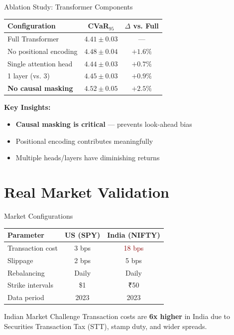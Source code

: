 \documentclass[aspectratio=169,11pt]{beamer}
\begin{document}
\begin{frame}{Ablation Study: Transformer Components}
\begin{table}
\centering
\begin{tabular}{lcc}
\toprule
\textbf{Configuration} & \textbf{CVaR$_{95}$} & \textbf{$\Delta$ vs. Full} \\
\midrule
Full Transformer & $4.41 \pm 0.03$ & --- \\
No positional encoding & $4.48 \pm 0.04$ & $+1.6\%$ \\
Single attention head & $4.44 \pm 0.03$ & $+0.7\%$ \\
1 layer (vs. 3) & $4.45 \pm 0.03$ & $+0.9\%$ \\
\textbf{No causal masking} & $4.52 \pm 0.05$ & $+2.5\%$ \\
\bottomrule
\end{tabular}
\end{table}

\vspace{0.3cm}
\textbf{Key Insights:}
\begin{itemize}
    \item \textbf{Causal masking is critical} — prevents look-ahead bias
    \item Positional encoding contributes meaningfully
    \item Multiple heads/layers have diminishing returns
\end{itemize}
\end{frame}

\section{Real Market Validation}

\begin{frame}{Market Configurations}
\begin{table}
\centering
\begin{tabular}{lcc}
\toprule
\textbf{Parameter} & \textbf{US (SPY)} & \textbf{India (NIFTY)} \\
\midrule
Transaction cost & 3 bps & \textcolor{darkred}{18 bps} \\
Slippage & 2 bps & 5 bps \\
Rebalancing & Daily & Daily \\
Strike intervals & \$1 & ₹50 \\
Data period & 2023 & 2023 \\
\bottomrule
\end{tabular}
\end{table}

\vspace{0.3cm}
\begin{alertblock}{Indian Market Challenge}
Transaction costs are \textbf{6x higher} in India due to Securities Transaction Tax (STT), stamp duty, and wider spreads.
\end{alertblock}
\end{frame}
\end{document}
